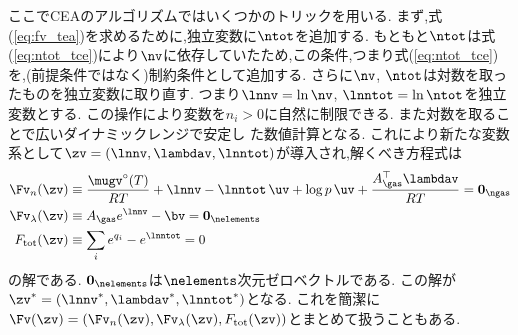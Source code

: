 ここでCEAのアルゴリズムではいくつかのトリックを用いる. まず,式(\ref{eq:fv_tea})を求めるために,独立変数に$\ntot$を追加する. もともと$\ntot$は式(\ref{eq:ntot_tce})により$\nv$に依存していたため,この条件,つまり式(\ref{eq:ntot_tce})を,(前提条件ではなく)制約条件として追加する. さらに$\nv$, $\ntot$は対数を取ったものを独立変数に取り直す. つまり$\lnnv = \ln{\nv}$, $\lnntot = \ln{\ntot}$を独立変数とする.  この操作により変数を$n_i > 0$に自然に制限できる. また対数を取ることで広いダイナミックレンジで安定し
た数値計算となる. これにより新たな変数系として$\zv = (\lnnv, \lambdav, \lnntot)$が導入され,解くべき方程式は
\begin{align}
\label{eq:Lpartialncea}
    \Fv_n (\zv) &\equiv \frac{\mugv^\circ(T)}{RT} + \lnnv - \lnntot \, \uv + \log{p} \, \uv  + \frac{A_\gas^\top \lambdav}{RT} = \boldsymbol{0}_\ngas \\
    \Fv_\lambda (\zv) &\equiv A_\gas e^{\lnnv} - \bv = \boldsymbol{0}_\nelements \\
    F_\mathrm{tot} (\zv) &\equiv \sum_i {e^{q_i}} - e^{\lnntot} = 0
\end{align}
の解である. $\boldsymbol{0}_\nelements$は$\nelements$次元ゼロベクトルである. この解が$\zv^\ast = (\lnnv^\ast, \lambdav^\ast, \lnntot^\ast)$となる. これを簡潔に$\Fv (\zv) = (\Fv_n (\zv), \Fv_\lambda (\zv), F_\mathrm{tot} (\zv))$とまとめて扱うこともある.  

